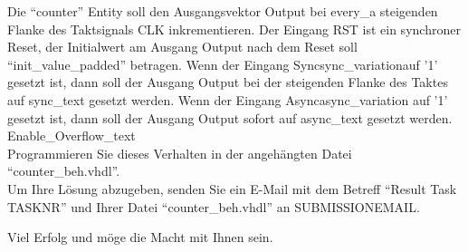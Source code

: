 \documentclass[a4paper,12pt]{article}
\begin{document}
Die "`counter"' Entity soll den Ausgangsvektor Output bei {{every_a}} steigenden Flanke des Taktsignals CLK inkrementieren. Der Eingang RST ist ein synchroner Reset, der Initialwert am Ausgang Output nach dem Reset soll "`{{init_value_padded}}"' betragen. Wenn der Eingang Sync{{sync_variation}}auf '1' gesetzt ist, dann soll der Ausgang Output bei der steigenden Flanke des Taktes auf {{sync_text}} gesetzt werden. Wenn der Eingang Async{{async_variation}} auf '1' gesetzt ist, dann soll der Ausgang Output sofort auf {{async_text}} gesetzt werden. {{Enable_Overflow_text}} \\

Programmieren Sie dieses Verhalten in der angeh\"angten Datei "`counter\_beh.vhdl"'.\\

Um Ihre L\"osung abzugeben, senden Sie ein E-Mail mit dem Betreff "`Result Task {{TASKNR}}"' und Ihrer Datei "`counter\_beh.vhdl"'  an {{SUBMISSIONEMAIL}}.

\vspace{0.7cm}

Viel Erfolg und m\"oge die Macht mit Ihnen sein.
\end{document}
